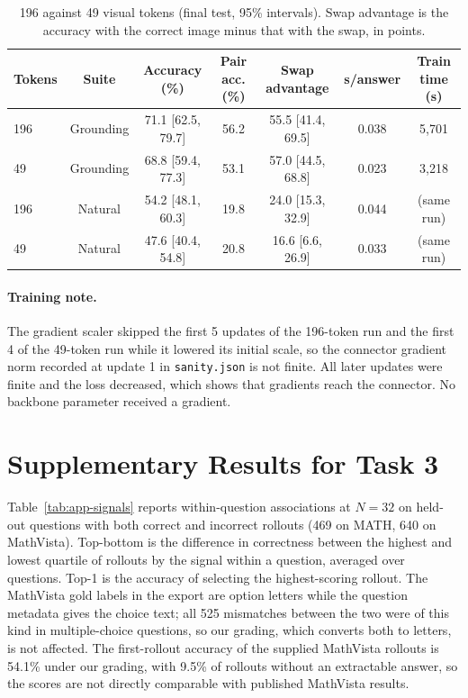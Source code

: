\documentclass{article}
\begin{document}
\begin{table}[H]
\centering
\caption{196 against 49 visual tokens (final test, 95\% intervals). Swap advantage is the accuracy with the correct image minus that with the swap, in points.}
\label{tab:t2-49}
\footnotesize
\begin{tabular}{lcccccc}
\toprule
Tokens & Suite & Accuracy (\%) & Pair acc. (\%) & Swap advantage & s/answer & Train time (s) \\
\midrule
196 & Grounding & 71.1 [62.5, 79.7] & 56.2 & 55.5 [41.4, 69.5] & 0.038 & 5,701 \\
49 & Grounding & 68.8 [59.4, 77.3] & 53.1 & 57.0 [44.5, 68.8] & 0.023 & 3,218 \\
196 & Natural & 54.2 [48.1, 60.3] & 19.8 & 24.0 [15.3, 32.9] & 0.044 & (same run) \\
49 & Natural & 47.6 [40.4, 54.8] & 20.8 & 16.6 [6.6, 26.9] & 0.033 & (same run) \\
\bottomrule
\end{tabular}
\end{table}

\paragraph{Training note.} The gradient scaler skipped the first 5 updates of the 196-token run and the first 4 of the 49-token run while it lowered its initial scale, so the connector gradient norm recorded at update 1 in \texttt{sanity.json} is not finite. All later updates were finite and the loss decreased, which shows that gradients reach the connector. No backbone parameter received a gradient.

\section{Supplementary Results for Task 3}
\label{app:t3}
Table~\ref{tab:app-signals} reports within-question associations at $N=32$ on held-out questions with both correct and incorrect rollouts (469 on MATH, 640 on MathVista). Top-bottom is the difference in correctness between the highest and lowest quartile of rollouts by the signal within a question, averaged over questions. Top-1 is the accuracy of selecting the highest-scoring rollout. The MathVista gold labels in the export are option letters while the question metadata gives the choice text; all 525 mismatches between the two were of this kind in multiple-choice questions, so our grading, which converts both to letters, is not affected. The first-rollout accuracy of the supplied MathVista rollouts is 54.1\% under our grading, with 9.5\% of rollouts without an extractable answer, so the scores are not directly comparable with published MathVista results.
\end{document}

